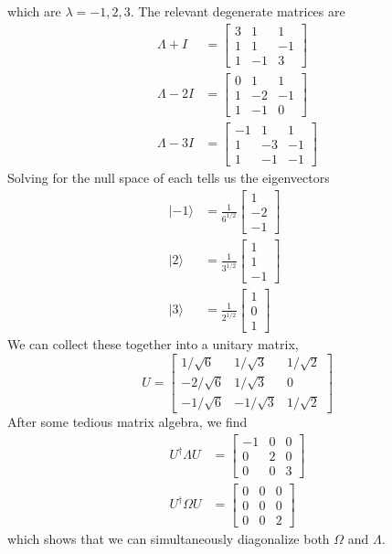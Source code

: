\documentclass[../principles-of-quantum-mechanics.tex]{subfiles}
\begin{document}
\begin{questions}
\begin{solution}
	which are $\lambda={-1}, 2, 3$. The relevant degenerate matrices are
	\begin{align*}
		\Lambda + I &= \begin{bmatrix}
			3 & 1 & 1 \\ 1 & 1 & -1 \\ 1 & -1 & 3
		\end{bmatrix} \\
		\Lambda - 2I &= \begin{bmatrix}
			0 & 1 & 1 \\ 1 & -2 & -1 \\ 1 & -1 & 0
		\end{bmatrix} \\
		\Lambda - 3I &= \begin{bmatrix}
			-1 & 1 & 1 \\ 1 & -3 & -1 \\ 1 & -1 & -1
		\end{bmatrix}
	\end{align*}
	Solving for the null space of each tells us the eigenvectors
	\begin{align*}
		|{-1}\rangle &= \frac{1}{6^{1/2}}\begin{bmatrix}1 \\ -2 \\ -1\end{bmatrix} \qquad \\
		|2\rangle &= \frac{1}{3^{1/2}}\begin{bmatrix}1 \\ 1 \\ {-1}\end{bmatrix} \\
		|3\rangle &= \frac{1}{2^{1/2}}\begin{bmatrix}1 \\ 0 \\ 1\end{bmatrix}
	\end{align*}
	\pagebreak
	We can collect these together into a unitary matrix,
	$$U = \begin{bmatrix}
		1/\sqrt{6} & 1/\sqrt{3} & 1/\sqrt{2} \\
		-2/\sqrt{6} & 1/\sqrt{3} & 0 \\
		-1/\sqrt{6} & -1/\sqrt{3} & 1/\sqrt{2}
		\end{bmatrix}$$
	After some tedious matrix algebra, we find
	\begin{align*}
		U^\dagger\Lambda{U} &= \begin{bmatrix}
			-1 & 0 & 0 \\ 0 & 2 & 0 \\ 0 & 0 & 3
		\end{bmatrix} \\
		U^\dagger\Omega{U} &= \begin{bmatrix}
			0 & 0 & 0 \\ 0 & 0 & 0 \\ 0 & 0 & 2
		\end{bmatrix}
	\end{align*}
	which shows that we can simultaneously diagonalize both $\Omega$ and $\Lambda$.
\end{solution}


\end{questions}
\end{document}
